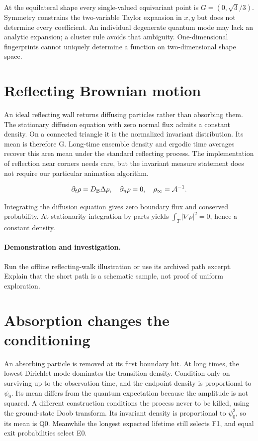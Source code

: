 \documentclass[11pt,oneside,openany]{book}
\begin{document}
At the equilateral shape every single-valued equivariant point is
$G=(0,\sqrt3/3)$. Symmetry constrains the two-variable Taylor expansion
in $x,y$ but does not determine every coefficient.
An individual degenerate quantum mode may lack an analytic expansion;
a cluster rule avoids that ambiguity.
One-dimensional fingerprints cannot uniquely determine a function
on two-dimensional shape space.




\section{Reflecting Brownian motion}\label{sec:slide56}

An ideal reflecting wall returns diffusing particles rather than absorbing them. The stationary diffusion equation with zero normal flux admits a constant density. On a connected triangle it is the normalized invariant distribution. Its mean is therefore G. Long-time ensemble density and ergodic time averages recover this area mean under the standard reflecting process. The implementation of reflection near corners needs care, but the invariant measure statement does not require our particular animation algorithm.


\[\partial_t\rho=D_{\rm B}\Delta\rho,\quad\partial_n\rho=0,\quad\rho_\infty=\mathcal A^{-1}.\]


Integrating the diffusion equation gives zero boundary flux
and conserved probability. At stationarity integration by parts yields
$\int_T|\nabla\rho|^2=0$, hence a constant density.



\paragraph{Demonstration and investigation.} Run the offline reflecting-walk illustration or use its archived path excerpt. Explain that the short path is a schematic sample, not proof of uniform exploration.


\section{Absorption changes the conditioning}\label{sec:slide57}

An absorbing particle is removed at its first boundary hit. At long times, the lowest Dirichlet mode dominates the transition density. Condition only on surviving up to the observation time, and the endpoint density is proportional to $\psi_0$. Its mean differs from the quantum expectation because the amplitude is not squared. A different construction conditions the process never to be killed, using the ground-state Doob transform. Its invariant density is proportional to $\psi_0^2$, so its mean is $\mathrm{Q0}$. Meanwhile the longest expected lifetime still selects F1, and equal exit probabilities select E0.
\end{document}
